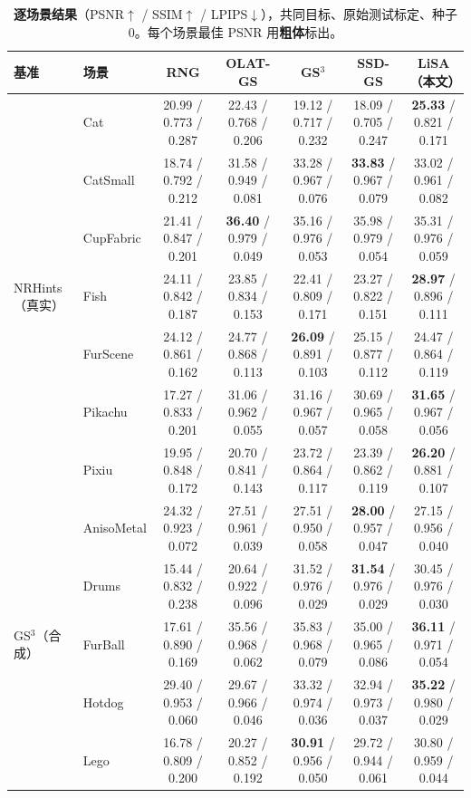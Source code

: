 \begin{table}[t]
\caption{\textbf{逐场景结果}（PSNR$\uparrow$ / SSIM$\uparrow$ / LPIPS$\downarrow$），共同目标、原始测试标定、种子 0。每个场景最佳 PSNR 用\textbf{粗体}标出。}
\label{tab:perscene}
\centering\scriptsize
\setlength{\tabcolsep}{3pt}
\begin{tabular}{@{}llccccc@{}}
\toprule
基准 & 场景 & RNG & OLAT-GS & GS$^3$ & SSD-GS & \textbf{LiSA（本文）} \\
\midrule
\multirow{7}{*}{NRHints（真实）} & Cat & 20.99 / 0.773 / 0.287 & 22.43 / 0.768 / 0.206 & 19.12 / 0.717 / 0.232 & 18.09 / 0.705 / 0.247 & \textbf{25.33} / 0.821 / 0.171 \\
 & CatSmall & 18.74 / 0.792 / 0.212 & 31.58 / 0.949 / 0.081 & 33.28 / 0.967 / 0.076 & \textbf{33.83} / 0.967 / 0.079 & 33.02 / 0.961 / 0.082 \\
 & CupFabric & 21.41 / 0.847 / 0.201 & \textbf{36.40} / 0.979 / 0.049 & 35.16 / 0.976 / 0.053 & 35.98 / 0.979 / 0.054 & 35.31 / 0.976 / 0.059 \\
 & Fish & 24.11 / 0.842 / 0.187 & 23.85 / 0.834 / 0.153 & 22.41 / 0.809 / 0.171 & 23.27 / 0.822 / 0.151 & \textbf{28.97} / 0.896 / 0.111 \\
 & FurScene & 24.12 / 0.861 / 0.162 & 24.77 / 0.868 / 0.113 & \textbf{26.09} / 0.891 / 0.103 & 25.15 / 0.877 / 0.112 & 24.47 / 0.864 / 0.119 \\
 & Pikachu & 17.27 / 0.833 / 0.201 & 31.06 / 0.962 / 0.055 & 31.16 / 0.967 / 0.057 & 30.69 / 0.965 / 0.058 & \textbf{31.65} / 0.967 / 0.056 \\
 & Pixiu & 19.95 / 0.848 / 0.172 & 20.70 / 0.841 / 0.143 & 23.72 / 0.864 / 0.117 & 23.39 / 0.862 / 0.119 & \textbf{26.20} / 0.881 / 0.107 \\
\midrule
\multirow{6}{*}{GS$^3$（合成）} & AnisoMetal & 24.32 / 0.923 / 0.072 & 27.51 / 0.961 / 0.039 & 27.51 / 0.950 / 0.058 & \textbf{28.00} / 0.957 / 0.047 & 27.15 / 0.956 / 0.040 \\
 & Drums & 15.44 / 0.832 / 0.238 & 20.64 / 0.922 / 0.096 & 31.52 / 0.976 / 0.029 & \textbf{31.54} / 0.976 / 0.029 & 30.45 / 0.976 / 0.030 \\
 & FurBall & 17.61 / 0.890 / 0.169 & 35.56 / 0.968 / 0.062 & 35.83 / 0.968 / 0.079 & 35.00 / 0.965 / 0.086 & \textbf{36.11} / 0.971 / 0.054 \\
 & Hotdog & 29.40 / 0.953 / 0.060 & 29.67 / 0.966 / 0.046 & 33.32 / 0.974 / 0.036 & 32.94 / 0.973 / 0.037 & \textbf{35.22} / 0.980 / 0.029 \\
 & Lego & 16.78 / 0.809 / 0.200 & 20.27 / 0.852 / 0.192 & \textbf{30.91} / 0.956 / 0.050 & 29.72 / 0.944 / 0.061 & 30.80 / 0.959 / 0.044 \\

\end{tabular}
\end{table}
